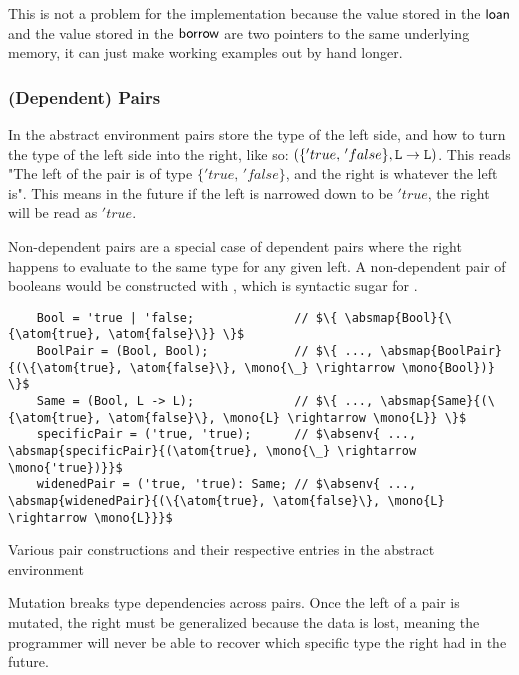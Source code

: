 \documentclass[12pt,twoside]{report}
\begin{document}
This is not a problem for the implementation because the value stored in the $\mathsf{loan}$ and the value stored in the $\mathsf{borrow}$ are two pointers to the same underlying memory, it can just make working examples out by hand longer.

\subsubsection{(Dependent) Pairs}
In the abstract environment pairs store the type of the left side, and how to turn the type of the left side into the right, like so: $(\{'true, \, 'false\}, \text{\texttt{L}} \rightarrow \text{\texttt{L}})$. This reads "The left of the pair is of type $\{'true, \, 'false\}$, and the right is whatever the left is". This means in the future if the left is narrowed down to be $'true$, the right will be read as $'true$.

Non-dependent pairs are a special case of dependent pairs where the right happens to evaluate to the same type for any given left. A non-dependent pair of booleans would be constructed with , which is syntactic sugar for .

\begin{listing}[H]
  \begin{verbatim}
    Bool = 'true | 'false;              // $\{ \absmap{Bool}{\{\atom{true}, \atom{false}\}} \}$
    BoolPair = (Bool, Bool);            // $\{ ..., \absmap{BoolPair}{(\{\atom{true}, \atom{false}\}, \mono{\_} \rightarrow \mono{Bool})} \}$
    Same = (Bool, L -> L);              // $\{ ..., \absmap{Same}{(\{\atom{true}, \atom{false}\}, \mono{L} \rightarrow \mono{L}} \}$
    specificPair = ('true, 'true);      // $\absenv{ ..., \absmap{specificPair}{(\atom{true}, \mono{\_} \rightarrow \mono{'true})}}$
    widenedPair = ('true, 'true): Same; // $\absenv{ ..., \absmap{widenedPair}{(\{\atom{true}, \atom{false}\}, \mono{L} \rightarrow \mono{L}}}$
  \end{verbatim}
  \caption{Various pair constructions and their respective entries in the abstract environment}
\end{listing}

Mutation breaks type dependencies across pairs. Once the left of a pair is mutated, the right must be generalized because the data is lost, meaning the programmer will never be able to recover which specific type the right had in the future.
\end{document}
